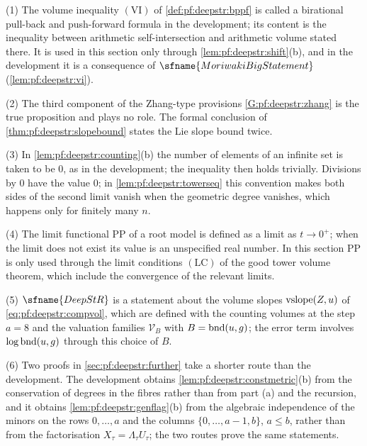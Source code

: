 \begin{remark}[Peculiarities]\label{rem:pf:deepstr:peculiar}
(1) The volume inequality $\mathrm{(VI)}$ of \cref{def:pf:deepstr:bppf} is called a birational pull-back and
push-forward formula in the development; its content is the inequality between arithmetic self-intersection
and arithmetic volume stated there. It is used in this section only through \cref{lem:pf:deepstr:shift}(b),
and in the development it is a consequence of $\sfname{MoriwakiBigStatement}$ (\cref{lem:pf:deepstr:vi}).

(2) The third component of the Zhang-type provisions \ref{G:pf:deepstr:zhang} is the true proposition and
plays no role. The formal conclusion of \cref{thm:pf:deepstr:slopebound} states the Lie slope bound twice.

(3) In \cref{lem:pf:deepstr:counting}(b) the number of elements of an infinite set is taken to be $0$, as in
the development; the inequality then holds trivially. Divisions by $0$ have the value $0$; in
\cref{lem:pf:deepstr:towerseq} this convention makes both sides of the second limit vanish when the geometric
degree vanishes, which happens only for finitely many $n$.

(4) The limit functional $\mathrm{PP}$ of a root model is defined as a limit as $t\to0^+$; when the limit
does not exist its value is an unspecified real number. In this section $\mathrm{PP}$ is only used through
the limit conditions $\mathrm{(LC)}$ of the good tower volume theorem, which include the convergence of the
relevant limits.

(5) $\sfname{DeepStR}$ is a statement about the volume slopes $\operatorname{vslope}(Z,u)$ of \eqref{eq:pf:deepstr:compvol},
which are defined with the counting volumes at the step $a=8$ and the valuation families $\mathcal V_B$ with
$B=\operatorname{bnd}(u,g)$; the error term involves $\log\operatorname{bnd}(u,g)$ through this choice of $B$.

(6) Two proofs in \cref{sec:pf:deepstr:further} take a shorter route than the development. The development
obtains \cref{lem:pf:deepstr:constmetric}(b) from the conservation of degrees in the fibres rather than from part
(a) and the recursion, and it obtains \cref{lem:pf:deepstr:genflag}(b) from the algebraic independence of the
minors on the rows $0,\dots,a$ and the columns $\{0,\dots,a-1,b\}$, $a\le b$, rather than from the factorisation
$X_\tau=\Lambda_\tau U_\tau$; the two routes prove the same statements.
\end{remark}

